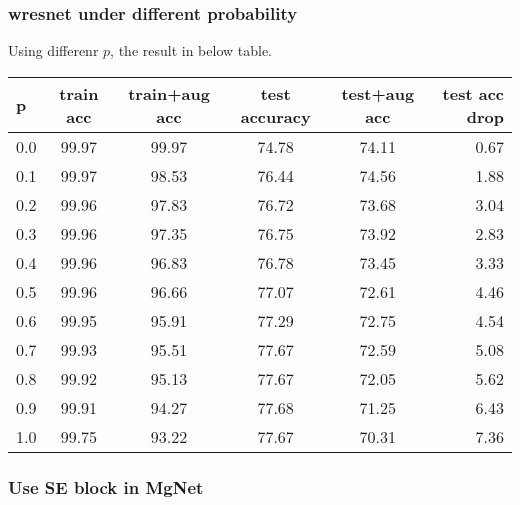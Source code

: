 \subsubsection{wresnet under different probability}
Using differenr $p$, the result in below table.\\
\begin{tabular}{| l | c | c | c | c | r |}
	\hline
	p          & train acc & train+aug acc & test accuracy  &  test+aug acc & test acc drop\\
	\hline
	0.0          &  99.97   & 99.97       &  74.78         &   74.11            &   0.67  \\
	\hline
	0.1          &  99.97   & 98.53       &  76.44         &   74.56            &   1.88  \\
	\hline
	0.2          &  99.96   & 97.83       &  76.72         &   73.68            &   3.04  \\
	\hline
	0.3          &  99.96   & 97.35       &  76.75         &   73.92            &   2.83  \\
	\hline
	0.4          &  99.96   & 96.83       &  76.78         &   73.45            &   3.33  \\
	\hline
	0.5          &  99.96   & 96.66       &  77.07         &   72.61            &   4.46  \\
	\hline
	0.6          &  99.95   & 95.91       &  77.29         &   72.75            &   4.54  \\
	\hline
	0.7          &  99.93   & 95.51       &  77.67         &   72.59            &   5.08  \\
	\hline
	0.8          &  99.92   & 95.13       &  77.67         &   72.05            &   5.62  \\
	\hline
	0.9          &  99.91   & 94.27       &  77.68         &   71.25            &   6.43  \\
	\hline
	1.0          &  99.75   & 93.22       &  77.67         &   70.31            &   7.36  \\
	\hline
\end{tabular}

\subsubsection{Use SE block in MgNet}
